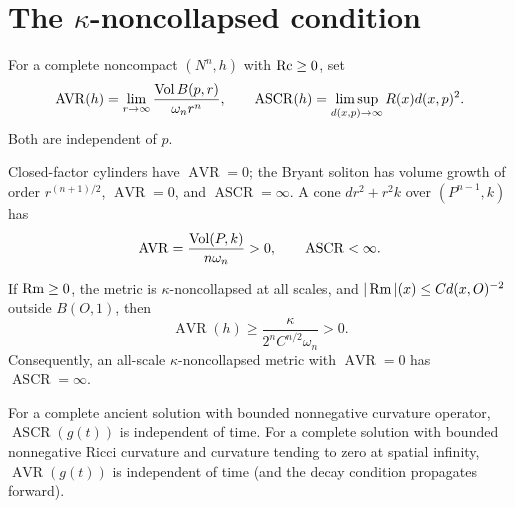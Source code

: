 \section{\texorpdfstring{The $\kappa$-noncollapsed condition}{The Kappa-noncollapsed condition}}

\begin{definition}
\label{def:chow-iii-asymptotic-ratios}
For a complete noncompact $(N^n,h)$ with $\operatorname{Rc}\ge0$, set
\[
\operatorname{AVR}(h)=\lim_{r\to\infty}\frac{\operatorname{Vol} B(p,r)}{\omega_n r^n},
\qquad
\operatorname{ASCR}(h)=\limsup_{d(x,p)\to\infty}R(x)d(x,p)^2.
\]
Both are independent of $p$.
\end{definition}

\begin{example}
\label{ex:chow-iii-avr-ascr-examples}
Closed-factor cylinders have $\operatorname{AVR}=0$; the Bryant soliton has
volume growth of order $r^{(n+1)/2}$, $\operatorname{AVR}=0$, and
$\operatorname{ASCR}=\infty$.  A cone $dr^2+r^2k$ over $(P^{n-1},k)$ has
\[
\operatorname{AVR}=\frac{\operatorname{Vol}(P,k)}{n\omega_n}>0,
\qquad \operatorname{ASCR}<\infty.
\]
\end{example}

\begin{proposition}
\label{prop:chow-iii-avr-from-ascr}
If $\operatorname{Rm}\ge0$, the metric is $\kappa$-noncollapsed at all scales, and
$|\operatorname{Rm}|(x)\le Cd(x,O)^{-2}$ outside $B(O,1)$, then
\[
\operatorname{AVR}(h)\ge\frac{\kappa}{2^nC^{n/2}\omega_n}>0.
\]
Consequently, an all-scale $\kappa$-noncollapsed metric with $\operatorname{AVR}=0$
has $\operatorname{ASCR}=\infty$.
\end{proposition}

\begin{theorem}
\label{thm:chow-iii-ascr-avr-time-invariance}
For a complete ancient solution with bounded nonnegative curvature operator,
$\operatorname{ASCR}(g(t))$ is independent of time.  For a complete solution
with bounded nonnegative Ricci curvature and curvature tending to zero at
spatial infinity, $\operatorname{AVR}(g(t))$ is independent of time (and the
decay condition propagates forward).
\end{theorem}


